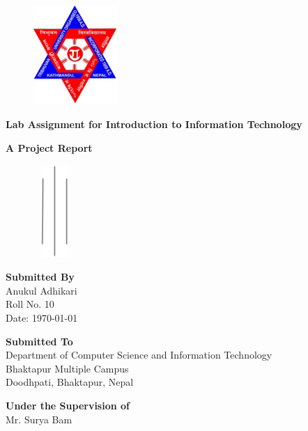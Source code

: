 \pagestyle{empty}
\begin{figure}[tp] %
\centering
\includegraphics[width=90pt]{./scrot/logo.png}
\end{figure}
\begin{center}
 {\Large \textbf{{Lab Assignment for Introduction to Information Technology}}}\par
 {\large \textbf{{A Project Report}\\}}
\begin{figure}[hbtp]
 \centering
\includegraphics[width=45pt,height=100pt]{./scrot/vlines.png}
\end{figure}
  {\Large \textbf{{Submitted By}\\}}
  {\Large Anukul Adhikari\\\large Roll No. 10\\ \large Date: {\today}}\par        
{\Large \textbf{{Submitted To}\\}}
{\large Department of Computer Science and Information Technology\\ Bhaktapur Multiple Campus \\
					Doodhpati, Bhaktapur, Nepal }\par					
{\Large\vspace*{5mm} \textbf {Under the Supervision of}\\
			\vspace*{3mm}\large Mr. Surya Bam}\par 
\end{center}
